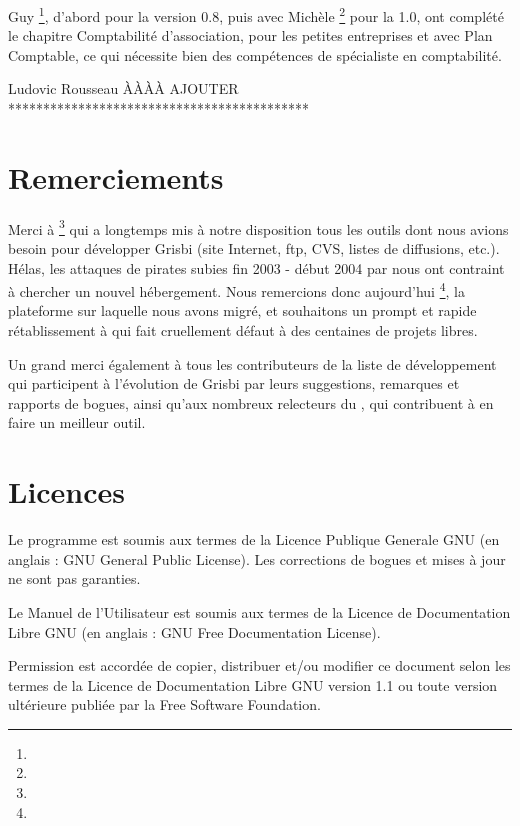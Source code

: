 {Guy }\footnote{\urlGuyLebegueEmail{}}, d'abord pour la version 0.8, puis avec {Michèle }\footnote{\urlMicheleBondilEmail{}} pour la 1.0, ont complété le chapitre Comptabilité d'association, pour les petites entreprises et avec Plan Comptable, ce qui nécessite bien des compétences de spécialiste en comptabilité.

Ludovic Rousseau ÀÀÀÀ AJOUTER *******************************************


\section{Remerciements\label{introduction-thanks}}


Merci à \footnote{\urlTuxFamily{}} qui a longtemps mis à notre disposition tous les outils dont nous avions besoin pour développer Grisbi
(site Internet, ftp, CVS, listes de diffusions, etc.). Hélas, les attaques
de pirates subies fin 2003 - début 2004 par  nous ont contraint à chercher un nouvel hébergement. Nous remercions donc aujourd'hui \footnote{\urlSourceForge{}}, la plateforme sur laquelle nous avons migré, et souhaitons un prompt et rapide rétablissement à  qui fait cruellement défaut à des centaines de projets libres.

Un grand merci également à tous les contributeurs de la liste de développement qui participent à l'évolution de Grisbi par leurs suggestions, remarques et rapports de bogues, ainsi qu'aux nombreux relecteurs du , qui contribuent à en faire un meilleur outil.


\section{Licences\label{introduction-licenses}}


Le programme est soumis aux termes de la \gls{Licence Publique Generale GNU} (en anglais : \gls{GNU General Public License}). Les corrections de bogues et mises à jour ne sont pas garanties.

Le Manuel de l'Utilisateur est soumis aux termes de la \gls{Licence de Documentation Libre GNU} (en anglais : \gls{GNU Free Documentation License}).

Permission est accordée de copier, distribuer et/ou modifier ce document selon les termes de la Licence de Documentation Libre GNU version 1.1 ou toute version ultérieure publiée par la \gls{Free Software Foundation}.


